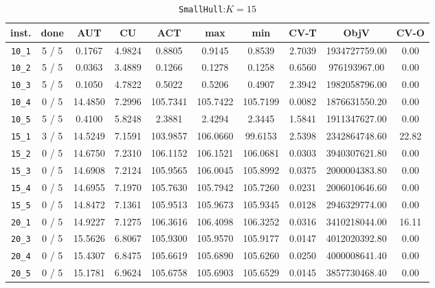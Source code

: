 \documentclass{scrartcl}
\begin{document}
\begin{table}[h!]
\begin{center}
\small
\begin{tabular}{| c | c | c | c | c | c | c | c | c | c |}
\hline
inst. & done & AUT & CU & ACT & max & min & CV-T & ObjV & CV-O \\
\hline
\verb|10_1| & 5 / 5 & 0.1767 & 4.9824 & 0.8805 & 0.9145 & 0.8539 & 2.7039 & 1934727759.00 & 0.00\\ 
\verb|10_2| & 5 / 5 & 0.0363 & 3.4889 & 0.1266 & 0.1278 & 0.1258 & 0.6560 & 976193967.00 & 0.00\\ 
\verb|10_3| & 5 / 5 & 0.1050 & 4.7822 & 0.5022 & 0.5206 & 0.4907 & 2.3942 & 1982058796.00 & 0.00\\ 
\verb|10_4| & 0 / 5 & 14.4850 & 7.2996 & 105.7341 & 105.7422 & 105.7199 & 0.0082 & 1876631550.20 & 0.00\\ 
\verb|10_5| & 5 / 5 & 0.4100 & 5.8248 & 2.3881 & 2.4294 & 2.3445 & 1.5841 & 1911347627.00 & 0.00\\ 
\verb|15_1| & 3 / 5 & 14.5249 & 7.1591 & 103.9857 & 106.0660 & 99.6153 & 2.5398 & 2342864748.60 & 22.82\\ 
\verb|15_2| & 0 / 5 & 14.6750 & 7.2310 & 106.1152 & 106.1521 & 106.0681 & 0.0303 & 3940307621.80 & 0.00\\ 
\verb|15_3| & 0 / 5 & 14.6908 & 7.2124 & 105.9565 & 106.0045 & 105.8992 & 0.0375 & 2000004383.80 & 0.00\\ 
\verb|15_4| & 0 / 5 & 14.6955 & 7.1970 & 105.7630 & 105.7942 & 105.7260 & 0.0231 & 2006010646.60 & 0.00\\ 
\verb|15_5| & 0 / 5 & 14.8472 & 7.1361 & 105.9513 & 105.9673 & 105.9345 & 0.0128 & 2946329774.00 & 0.00\\ 
\verb|20_1| & 0 / 5 & 14.9227 & 7.1275 & 106.3616 & 106.4098 & 106.3252 & 0.0316 & 3410218044.00 & 16.11\\ 
\verb|20_3| & 0 / 5 & 15.5626 & 6.8067 & 105.9300 & 105.9570 & 105.9177 & 0.0147 & 4012020392.80 & 0.00\\ 
\verb|20_4| & 0 / 5 & 15.4307 & 6.8475 & 105.6619 & 105.6890 & 105.6260 & 0.0250 & 4000008641.40 & 0.00\\ 
\verb|20_5| & 0 / 5 & 15.1781 & 6.9624 & 105.6758 & 105.6903 & 105.6529 & 0.0145 & 3857730468.40 & 0.00\\ 
\hline
\end{tabular}
\caption{\texttt{SmallHull}:$K=15$}
\label{table:hull:15}
\end{center}
\end{table}
\end{document}
